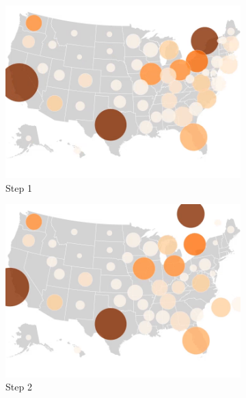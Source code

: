 \begin{figure}
    \begin{subfigure}[b]{0.31\textwidth}
        \centering
        \includegraphics[width=\textwidth]{images/results/dot_cartogram/transition_7.png}
        \caption[]%
        {{\small Step 1}}
    \end{subfigure}
    \hfill
    \begin{subfigure}[b]{0.31\textwidth}
        \centering
        \includegraphics[width=\textwidth]{images/results/dot_cartogram/transition_8.png}
        \caption[]%
        {{\small Step 2}}
    \end{subfigure}
    \hfill
    \begin{subfigure}[b]{0.31\textwidth}
        \centering

\end{subfigure}
\end{figure}
